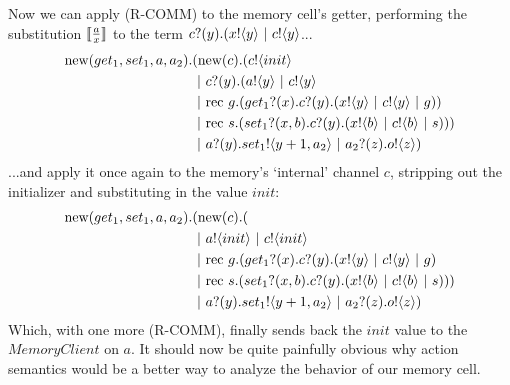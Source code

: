 Now we can apply (R-COMM) to the memory cell's getter, performing the substitution $\subst{a}{x}$ to the term ${c}?({y}).({x}!\langle{y}\rangle\ |\  {c}!\langle{y}\rangle$...
\begin{equation}\begin{split}
	\text{new}({get_1, set_1,a,a_2}).&(\text{new}({c}). ({c}!\langle{init}\rangle \\
		&\ |\  {c}?({y}).({a}!\langle{y}\rangle\ |\  {c}!\langle{y}\rangle \\
		&\ |\ \text{rec }{g}.({get_1}?({x}).{c}?({y}).({x}!\langle{y}\rangle\ |\  {c}!\langle{y}\rangle\ |\  g))\\
		&\ |\ \text{rec }{s}.({set_1}?({x,b}).{c}?({y}).({x}!\langle{b}\rangle\ |\ {c}!\langle{b}\rangle\ |\  s)))\\
		&\ |\  {a}?({y}). {set_1}!\langle{y+1,a_2}\rangle \ |\  {a_2}?({z}).{o}!\langle{z}\rangle)
\end{split}\end{equation}
...and apply it once again to the memory's `internal' channel $c$, stripping out the initializer and substituting in the value $init$:
\begin{equation}\begin{split}
	\text{new}({get_1, set_1,a,a_2}).&(\text{new}({c}). (\\
		&\ |\  {a}!\langle{init}\rangle\ |\  {c}!\langle{init}\rangle \\
		&\ |\ \text{rec }{g}.({get_1}?({x}).{c}?({y}).({x}!\langle{y}\rangle\ |\  {c}!\langle{y}\rangle\ |\  g)\\
		&\ |\ \text{rec }{s}.({set_1}?({x,b}).{c}?({y}).({x}!\langle{b}\rangle\ |\ {c}!\langle{b}\rangle\ |\  s)))\\
		&\ |\  {a}?({y}). {set_1}!\langle{y+1,a_2}\rangle \ |\  {a_2}?({z}).{o}!\langle{z}\rangle)
\end{split}\end{equation}
Which, with one more (R-COMM), finally sends back the $init$ value to the $MemoryClient$ on $a$.  
It should now be quite painfully obvious why action semantics would be a better way to analyze the behavior of our memory cell.  

